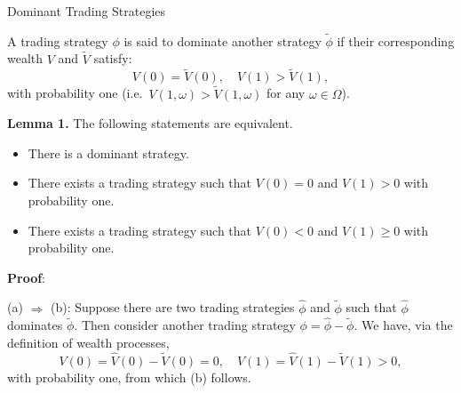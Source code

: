 \documentclass{beamer}
\begin{document}
\begin{frame}{Dominant Trading Strategies}

    {\footnotesize \footnotesize
    
    A trading strategy \(\phi\) is said to dominate another strategy \(\tilde{\phi}\) if their corresponding wealth \(V\) and \(\tilde{V}\) satisfy:
    \[
    V(0) = \tilde{V}(0),\quad V(1) > \tilde{V}(1),
    \]
    with probability one (i.e.\ \(V(1, \omega) > \tilde{V}(1, \omega)\) for any \(\omega \in \Omega\)).
    \vspace{1em}
    \par  \pause \textbf{Lemma 1.} The following statements are equivalent.
    \begin{itemize}
        \item There is a dominant strategy.
        \item There exists a trading strategy such that \(V(0) = 0\) and \(V(1) > 0\) with probability one.
        \item There exists a trading strategy such that \(V(0) < 0\) and \(V(1) \geq 0\) with probability one.
    \end{itemize}
    \par \pause  \textbf{Proof}:
    \par (a) \(\Rightarrow\) (b): Suppose there are two trading strategies \(\hat{\phi}\) and \(\tilde{\phi}\) such that \(\hat{\phi}\) dominates \(\tilde{\phi}\). Then consider another trading strategy \(\phi = \hat{\phi} - \tilde{\phi}\). We have, via the definition of wealth processes,
    \[
    V(0) = \hat{V}(0) - \tilde{V}(0) = 0,\quad V(1) = \hat{V}(1) - \tilde{V}(1) > 0,
    \]
    with probability one, from which (b) follows.
    }
\end{frame}
\end{document}
